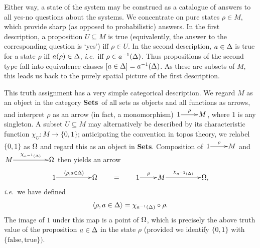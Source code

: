 \documentclass[11pt]{article}
\newcommand{\beq}{\begin{equation}}
\newcommand{\eeq}{\end{equation}}
\newcommand{\Sets}{\mbox{\textbf{Sets}}}
\newcommand{\raw}{\rightarrow} \newcommand{\rat}{\mapsto}
\newcommand{\inv}{^{-1}}
\newcommand{\rh}{\rho} \newcommand{\sg}{\sigma}
\newcommand{\ch}{\chi} \newcommand{\ps}{\psi} \newcommand{\Ps}{\Psi}
\newcommand{\ie}{\textit{i.e.}}
\begin{document}
 Either way, a state of the system may be construed as a catalogue of answers
 to all yes-no questions about the systems. We concentrate on pure states
  $\rh\in M$, which provide sharp (as opposed to probabilistic)
  answers. In the first description, a proposition $U\subseteq M$ is
  true (equivalently, the answer to the corresponding question is
  `yes') iff $\rh\in U$. In the second description, $a\in\Delta$ is true
  for a state $\rh$ iff $a(\rh)\in\Dl$, \ie\ iff $\rh\in a\inv(\Dl)$.
 Thus propositions of the second type fall into equivalence classes
 $[a\in \Delta]=a\inv(\Dl)$. As these are subsets of $M$, this leads us back to the purely spatial picture of the first description.

This truth assignment has a very simple categorical description. We regard
$M$ as an object in the category \Sets\ of all sets as objects and all
functions as arrows, and interpret $\rho$ as an arrow (in fact, a monomorphism)
$\xymatrix@1{1 \ar^-{\rho}[r] & M}$, where 1 is any singleton.
A subset $U\subseteq M$ may
alternatively be described by its characteristic function
$\ch_U:M\raw \{0,1\}$; anticipating the convention  in topos
theory, we relabel $\{0,1\}$ as $\Omega$ and regard this as an
object in \Sets. Composition of  $\xymatrix@1{1\ar^-{\rho}[r]&M}$ and
$\xymatrix@1{M\ar^-{\ch_{a\inv(\Dl)}}[rr]&&\Om}$ then yields an arrow
\beq
  \xymatrix@1{1 \ar^-{\langle \rho,a\in \Dl\rangle}[rr] && \Om}
  \qquad=\qquad
  \xymatrix@1{1 \ar^-{\rho}[r] & M \ar^-{\ch_{a\inv(\Dl)}}[rr] && \Om,}
\eeq
\ie\ we have defined
\beq
\langle \rho,a\in \Dl\rangle=\ch_{a\inv(\Dl)}\circ\rho.\label{circrho}\eeq
The image of $1$ under this map is
a point of $\Omega$, which is precisely the above truth value of
the proposition $a\in \Delta$ in the state $\rho$ (provided we identify
$\{0,1\}$ with $\{\mathrm{false, true}\})$.
\end{document}
